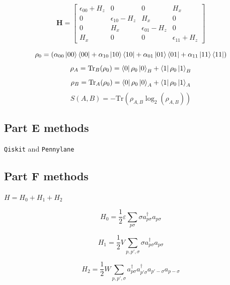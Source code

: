 \begin{equation}
    \mathbf{H} = \begin{bmatrix}
        \epsilon_{00}+H_z & 0 & 0 & H_x \\
        0 & \epsilon_{10}-H_z & H_x & 0 \\
        0 & H_x & \epsilon_{01}-H_z & 0 \\
        H_x & 0 & 0 & \epsilon_{11}+H_z
    \end{bmatrix}
\end{equation}

\begin{equation}
    \rho_0 = 
    (\alpha_{00}\left| 00 \right\rangle\left\langle 00 \right| + 
    \alpha_{10}\left| 10 \right\rangle\left\langle 10 \right| +
    \alpha_{01}\left| 01 \right\rangle\left\langle 01 \right| +
    \alpha_{11}\left| 11 \right\rangle\left\langle 11 \right|)
\end{equation}
\begin{equation}
    \rho_A=\text{Tr}_B(\rho_0)=\left\langle 0 \right|\rho_0\left| 0 \right\rangle_B+\left\langle 1 \right|\rho_0\left| 1 \right\rangle_B
\end{equation}
\begin{equation}
    \rho_B=\text{Tr}_A(\rho_0)=\left\langle 0 \right|\rho_0\left| 0 \right\rangle_A+\left\langle 1 \right|\rho_0\left| 1 \right\rangle_A
\end{equation}
\begin{equation}
    S(A,B)=-\text{Tr}(\rho_{A,B}\log_2(\rho_{A,B}))
\end{equation}

\subsection{Part E methods}

\texttt{Qiskit} and \texttt{Pennylane}

\subsection{Part F methods}

$H=H_0+H_1+H_2$

\begin{equation}
    H_0=\frac{1}{2}\varepsilon\sum_{p\sigma}\sigma a_{p\sigma}^{\dagger}a_{p\sigma}
\end{equation}

\begin{equation}
    H_1=\frac{1}{2}V\sum_{p,p',\sigma}\sigma a_{p\sigma}^{\dagger}a_{p\sigma}
\end{equation}

\begin{equation}
    H_2=\frac{1}{2}W\sum_{p,p',\sigma}a_{p\sigma}^{\dagger}a_{p'\sigma}^{\dagger}a_{p'-\sigma}a_{p-\sigma}
\end{equation}

